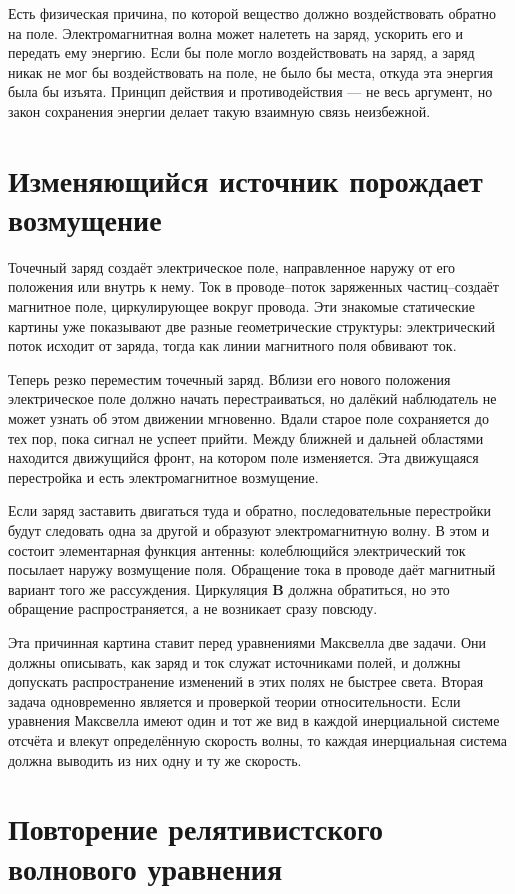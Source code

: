 Есть физическая причина, по которой вещество должно воздействовать обратно на поле. Электромагнитная волна может налететь на заряд, ускорить его и передать ему энергию. Если бы поле могло воздействовать на заряд, а заряд никак не мог бы воздействовать на поле, не было бы места, откуда эта энергия была бы изъята. Принцип действия и противодействия — не весь аргумент, но закон сохранения энергии делает такую взаимную связь неизбежной.

\section{Изменяющийся источник порождает возмущение}

Точечный заряд создаёт электрическое поле, направленное наружу от его положения или внутрь к нему. Ток в проводе--поток заряженных частиц--создаёт магнитное поле, циркулирующее вокруг провода. Эти знакомые статические картины уже показывают две разные геометрические структуры: электрический поток исходит от заряда, тогда как линии магнитного поля обвивают ток.

Теперь резко переместим точечный заряд. Вблизи его нового положения электрическое поле должно начать перестраиваться, но далёкий наблюдатель не может узнать об этом движении мгновенно. Вдали старое поле сохраняется до тех пор, пока сигнал не успеет прийти. Между ближней и дальней областями находится движущийся фронт, на котором поле изменяется. Эта движущаяся перестройка и есть электромагнитное возмущение.

Если заряд заставить двигаться туда и обратно, последовательные перестройки будут следовать одна за другой и образуют электромагнитную волну. В этом и состоит элементарная функция антенны: колеблющийся электрический ток посылает наружу возмущение поля. Обращение тока в проводе даёт магнитный вариант того же рассуждения. Циркуляция \(\mathbf B\) должна обратиться, но это обращение распространяется, а не возникает сразу повсюду.

Эта причинная картина ставит перед уравнениями Максвелла две задачи. Они должны описывать, как заряд и ток служат источниками полей, и должны допускать распространение изменений в этих полях не быстрее света. Вторая задача одновременно является и проверкой теории относительности. Если уравнения Максвелла имеют один и тот же вид в каждой инерциальной системе отсчёта и влекут определённую скорость волны, то каждая инерциальная система должна выводить из них одну и ту же скорость.

\section{Повторение релятивистского волнового уравнения}

